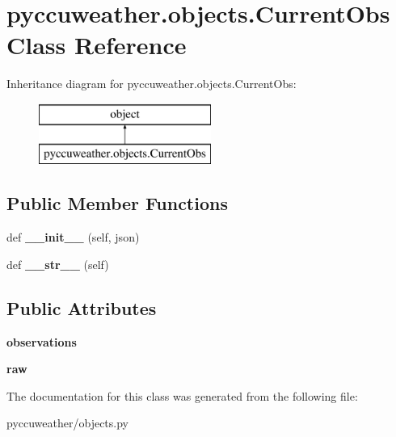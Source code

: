 \hypertarget{classpyccuweather_1_1objects_1_1_current_obs}{}\section{pyccuweather.\+objects.\+Current\+Obs Class Reference}
\label{classpyccuweather_1_1objects_1_1_current_obs}
Inheritance diagram for pyccuweather.\+objects.\+Current\+Obs\+:\begin{figure}[H]
\begin{center}
\leavevmode
\includegraphics[height=2.000000cm]{classpyccuweather_1_1objects_1_1_current_obs}
\end{center}
\end{figure}
\subsection*{Public Member Functions}
\begin{DoxyCompactItemize}
\item 
\hypertarget{classpyccuweather_1_1objects_1_1_current_obs_afc5952bf9fd5841532045b281ed0e3b2}{}def {\bfseries \+\_\+\+\_\+init\+\_\+\+\_\+} (self, json)\label{classpyccuweather_1_1objects_1_1_current_obs_afc5952bf9fd5841532045b281ed0e3b2}

\item 
\hypertarget{classpyccuweather_1_1objects_1_1_current_obs_a4129560bbed935d0ba4710f8201d5ccd}{}def {\bfseries \+\_\+\+\_\+str\+\_\+\+\_\+} (self)\label{classpyccuweather_1_1objects_1_1_current_obs_a4129560bbed935d0ba4710f8201d5ccd}

\end{DoxyCompactItemize}
\subsection*{Public Attributes}
\begin{DoxyCompactItemize}
\item 
\hypertarget{classpyccuweather_1_1objects_1_1_current_obs_acf2488e0a0f0bcd9fd2d584fac16126d}{}{\bfseries observations}\label{classpyccuweather_1_1objects_1_1_current_obs_acf2488e0a0f0bcd9fd2d584fac16126d}

\item 
\hypertarget{classpyccuweather_1_1objects_1_1_current_obs_aaf9ce2cb50699fa70a4f5371acf5e531}{}{\bfseries raw}\label{classpyccuweather_1_1objects_1_1_current_obs_aaf9ce2cb50699fa70a4f5371acf5e531}

\end{DoxyCompactItemize}


The documentation for this class was generated from the following file\+:\begin{DoxyCompactItemize}
\item 
pyccuweather/objects.\+py\end{DoxyCompactItemize}
